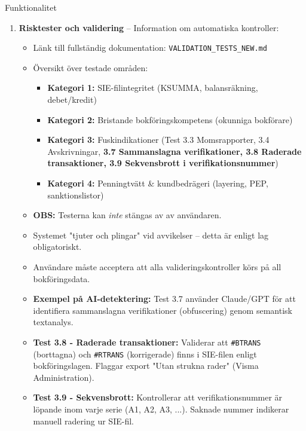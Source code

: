 \documentclass[10pt]{beamer}
\begin{document}
\begin{frame}[fragile]
\begin{block}{Funktionalitet}
\begin{enumerate}
      \item \textbf{Risktester och validering} – Information om automatiska kontroller:
        \begin{itemize}
          \item Länk till fullständig dokumentation: \texttt{VALIDATION\_TESTS\_NEW.md}
          \item Översikt över testade områden:
            \begin{itemize}
              \item \textbf{Kategori 1:} SIE-filintegritet (KSUMMA, balansräkning, debet/kredit)
              \item \textbf{Kategori 2:} Bristande bokföringskompetens (okunniga bokförare)
              \item \textbf{Kategori 3:} Fuskindikationer (Test 3.3 Momsrapporter, 3.4 Avskrivningar, \textbf{3.7 Sammanslagna verifikationer, 3.8 Raderade transaktioner, 3.9 Sekvensbrott i verifikationsnummer})
              \item \textbf{Kategori 4:} Penningtvätt \& kundbedrägeri (layering, PEP, sanktionslistor)
            \end{itemize}
          \item \textbf{OBS:} Testerna kan \textit{inte} stängas av av användaren.
          \item Systemet "tjuter och plingar" vid avvikelser – detta är enligt lag obligatoriskt.
          \item Användare måste acceptera att alla valideringskontroller körs på all bokföringsdata.
          \item \textbf{Exempel på AI-detektering:} Test 3.7 använder Claude/GPT för att identifiera sammanslagna verifikationer (obfuscering) genom semantisk textanalys.
          \item \textbf{Test 3.8 - Raderade transaktioner:} Validerar att \texttt{\#BTRANS} (borttagna) och \texttt{\#RTRANS} (korrigerade) finns i SIE-filen enligt bokföringslagen. Flaggar export "Utan strukna rader" (Visma Administration).
          \item \textbf{Test 3.9 - Sekvensbrott:} Kontrollerar att verifikationsnummer är löpande inom varje serie (A1, A2, A3, ...). Saknade nummer indikerar manuell radering ur SIE-fil.
        \end{itemize}
      \vspace{0.2cm}
      

\end{enumerate}
\end{block}
\end{frame}
\end{document}
